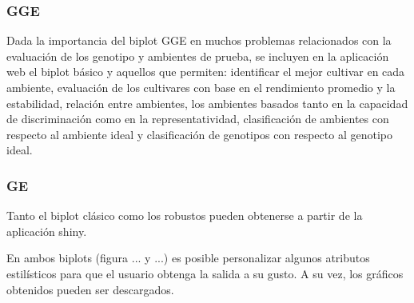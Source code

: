 \subsubsection{GGE}
Dada la importancia del biplot GGE en muchos problemas relacionados con la evaluación de los genotipo y ambientes de prueba, se incluyen en la aplicación web el biplot básico y aquellos que permiten: identificar el mejor cultivar en cada ambiente, evaluación de los cultivares con base en el rendimiento promedio y la estabilidad, relación entre ambientes, los ambientes basados tanto en la capacidad de discriminación como en la representatividad, clasificación de ambientes con respecto al ambiente ideal y  clasificación de genotipos con respecto al genotipo ideal.


\subsubsection{GE}
Tanto el biplot clásico como los robustos pueden obtenerse a partir de la aplicación shiny.



En ambos biplots (figura ... y ...) es posible personalizar algunos atributos estilísticos para que el usuario obtenga la salida a su gusto. A su vez, los gráficos obtenidos pueden ser descargados.

